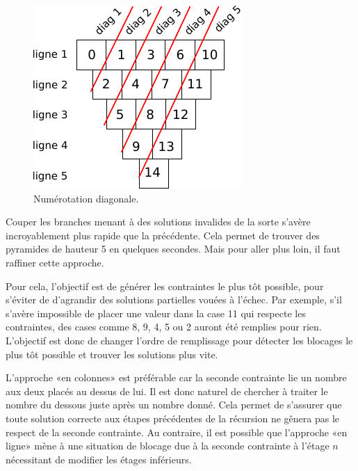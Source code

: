 \documentclass[10pt]{article}\usepackage[nu]{esial}
\begin{document}
\begin{figure}
  \vspace{-.6\baselineskip}
  \centerline{\includegraphics[scale=.9]{img/numerotation-diagonales.pdf}}
  \vspace{-.5\baselineskip}
  \caption{Numérotation diagonale.}
  \label{fig:numdiag}
   \vspace{-1.5\baselineskip}
\end{figure}

Couper les branches menant à des solutions invalides de la sorte s'avère
incroyablement plus rapide que la précédente. Cela permet de trouver des
pyramides de hauteur 5 en quelques secondes. Mais pour aller plus loin, il faut
raffiner cette approche.

Pour cela, l'objectif est de générer les contraintes le plus tôt possible, pour
s'éviter de d'agrandir des solutions partielles vouées à l'échec. Par exemple,
s'il s'avère impossible de placer une valeur dans la case 11 qui respecte les
contraintes, des cases comme 8, 9, 4, 5 ou 2 auront été remplies pour
rien. L'objectif est donc de changer l'ordre de remplissage pour détecter les
blocages le plus tôt possible et trouver les solutions plus vite.

L'approche «en colonnes» est préférable car la seconde contrainte lie un nombre
aux deux placés au dessus de lui. Il est donc naturel de chercher à traiter le
nombre du dessous juste après un nombre donné. Cela permet de s'assurer que
toute solution correcte aux étapes précédentes de la récursion ne gênera pas le
respect de la seconde contrainte. Au contraire, il est possible que l'approche
«en ligne» mène à une situation de blocage due à la seconde contrainte à l'étage
$n$ nécessitant de modifier les étages inférieurs.
\end{document}
